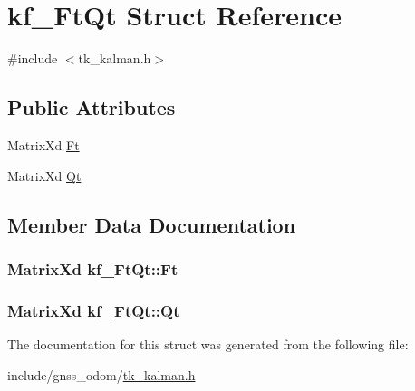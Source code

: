 \hypertarget{structkf___ft_qt}{\section{kf\-\_\-\-Ft\-Qt Struct Reference}
\label{structkf___ft_qt}
}


{\ttfamily \#include $<$tk\-\_\-kalman.\-h$>$}

\subsection*{Public Attributes}
\begin{DoxyCompactItemize}
\item 
Matrix\-Xd \hyperlink{structkf___ft_qt_a01d54d1c1f98ee1701116b7379768bee}{Ft}
\item 
Matrix\-Xd \hyperlink{structkf___ft_qt_a54f3e3a5e61f1d3920ca51774ed2413f}{Qt}
\end{DoxyCompactItemize}


\subsection{Member Data Documentation}
\hypertarget{structkf___ft_qt_a01d54d1c1f98ee1701116b7379768bee}{
\subsubsection[{Ft}]{\setlength{\rightskip}{0pt plus 5cm}Matrix\-Xd kf\-\_\-\-Ft\-Qt\-::\-Ft}}\label{structkf___ft_qt_a01d54d1c1f98ee1701116b7379768bee}
\hypertarget{structkf___ft_qt_a54f3e3a5e61f1d3920ca51774ed2413f}{
\subsubsection[{Qt}]{\setlength{\rightskip}{0pt plus 5cm}Matrix\-Xd kf\-\_\-\-Ft\-Qt\-::\-Qt}}\label{structkf___ft_qt_a54f3e3a5e61f1d3920ca51774ed2413f}


The documentation for this struct was generated from the following file\-:\begin{DoxyCompactItemize}
\item 
include/gnss\-\_\-odom/\hyperlink{tk__kalman_8h}{tk\-\_\-kalman.\-h}\end{DoxyCompactItemize}
